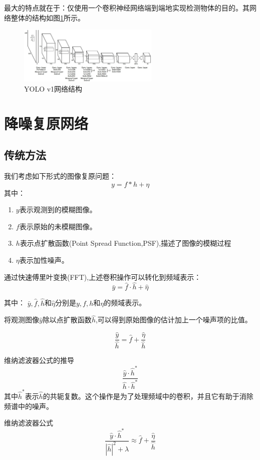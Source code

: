 \documentclass{lzureport}
\begin{document}
最大的特点就在于：仅使用一个卷积神经网络端到端地实现检测物体的目的。其网络整体的结构如图\ref{fig:YOLOv1网络结构}所示。
\begin{figure}[htpb]
	\centering
	\includegraphics[width=0.6\textwidth]{figure/YOLOv1网络结构.png}
	\caption{YOLO v1网络结构}
	\label{fig:YOLOv1网络结构}
\end{figure}






\newpage
\section{降噪复原网络}
\subsection{传统方法}
我们考虑如下形式的图像复原问题：
$$y=f*h+\eta $$
其中：
 \begin{enumerate}[itemindent=1em,label=\arabic*)]
	\item $y$表示观测到的模糊图像。
	\item $f$表示原始的未模糊图像。
	\item $h$表示点扩散函数(Point Spread Function,PSF),描述了图像的模糊过程
	\item $\eta$表示加性噪声。
 \end{enumerate}
 
 通过快速傅里叶变换(FFT),上述卷积操作可以转化到频域表示：
 $$\bar{y}=\hat{f}\cdot\hat{h}+\hat{\eta}$$
 
 其中：
$\bar{y} , \hat{f} , \hat{h}$和$\hat{\eta}$分别是$y,f,h$和$\eta$的频域表示。

将观测图像$\hat{y}$除以点扩散函数$\hat{h}$,可以得到原始图像的估计加上一个噪声项的比值。

$$\frac{\hat{y}}{\hat{h}}=\hat{f}+\frac{\hat{\eta}}{\hat{h}}$$

维纳滤波器公式的推导
$$\frac{\hat{y}\cdot\hat{h}^*}{\hat{h}\cdot\hat{h}^*}$$
其中$\hat{h}^*$表示$\hat{h}$的共轭复数。这个操作是为了处理频域中的卷积，并且它有助于消除频谱中的噪声。

维纳滤波器公式
$$\frac{\hat y\cdot\hat h^*}{|\hat h|^2+\lambda}\approx\hat f+\frac{\hat\eta}{\hat h}$$
\end{document}
